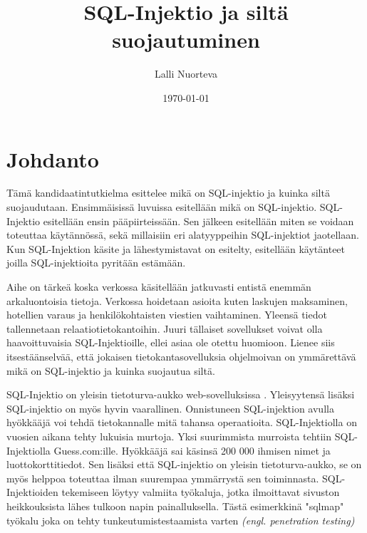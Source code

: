 \documentclass[finnish]{tktltiki2}
\title{SQL-Injektio ja siltä suojautuminen}
\author{Lalli Nuorteva}
\date{\today}
\theoremstyle{definition}
\theoremstyle{remark}
\begin{document}
\frontmatter      %

\maketitle        %

\tableofcontents  %


\mainmatter       %

\section{Johdanto}
Tämä kandidaatintutkielma esittelee mikä on SQL-injektio ja kuinka siltä suojaudutaan. Ensimmäisissä luvuissa esitellään mikä on SQL-injektio. SQL-Injektio esitellään ensin pääpiirteissään. Sen jälkeen esitellään miten se voidaan toteuttaa käytännössä, sekä millaisiin eri alatyyppeihin SQL-injektiot jaotellaan. Kun SQL-Injektion käsite ja lähestymistavat on esitelty, esitellään käytänteet joilla SQL-injektioita pyritään estämään.

Aihe on tärkeä koska verkossa käsitellään jatkuvasti entistä enemmän arkaluontoisia tietoja. Verkossa hoidetaan asioita kuten laskujen maksaminen, hotellien varaus ja henkilökohtaisten viestien vaihtaminen. Yleensä tiedot tallennetaan relaatiotietokantoihin. Juuri tällaiset sovellukset voivat olla haavoittuvaisia SQL-Injektioille, ellei asiaa ole otettu huomioon. Lienee siis itsestäänselvää, että jokaisen tietokantasovelluksia ohjelmoivan on ymmärettävä mikä on SQL-injektio ja kuinka suojautua siltä.

SQL-Injektio on yleisin tietoturva-aukko web-sovelluksissa \cite{detection}. Yleisyytensä lisäksi SQL-injektio on myös hyvin vaarallinen. Onnistuneen SQL-injektion avulla hyökkääjä voi tehdä tietokannalle mitä tahansa operaatioita. SQL-Injektiolla on vuosien aikana tehty lukuisia murtoja. Yksi suurimmista murroista tehtiin SQL-Injektiolla Guess.com:ille. Hyökkääjä sai käsinsä 200 000 ihmisen nimet ja luottokorttitiedot. Sen lisäksi että SQL-injektio on yleisin tietoturva-aukko, se on myös helppoa toteuttaa ilman suurempaa ymmärrystä sen toiminnasta. SQL-Injektioiden tekemiseen löytyy valmiita työkaluja, jotka ilmoittavat sivuston heikkouksista lähes tulkoon napin painalluksella. Tästä esimerkkinä "sqlmap" työkalu joka on tehty tunkeutumistestaamista varten \textit{(engl. penetration testing)}
\end{document}
